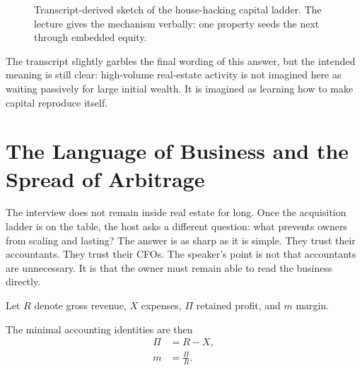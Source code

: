 \begin{figure}
\centering
{}
\caption{Transcript-derived sketch of the house-hacking capital ladder. The lecture gives the mechanism verbally: one property seeds the next through embedded equity.}
\end{figure}

The transcript slightly garbles the final wording of this answer, but the intended meaning is still clear: high-volume real-estate activity is not imagined here as waiting passively for large initial wealth. It is imagined as learning how to make capital reproduce itself.

\section{The Language of Business and the Spread of Arbitrage}

The interview does not remain inside real estate for long. Once the acquisition ladder is on the table, the host asks a different question: what prevents owners from scaling and lasting? The answer is as sharp as it is simple. They trust their accountants. They trust their CFOs. The speaker's point is not that accountants are unnecessary. It is that the owner must remain able to read the business directly.

\begin{definition}
Let \(R\) denote gross revenue, \(X\) expenses, \(\Pi\) retained profit, and \(m\) margin.
\end{definition}

The minimal accounting identities are then
\begin{align}
\Pi &= R - X,\\
m &= \frac{\Pi}{R}.
\end{align}

